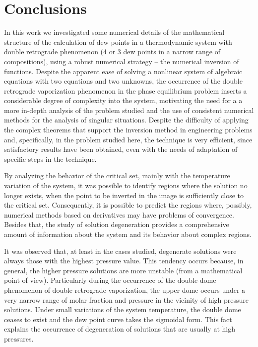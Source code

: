 \documentclass[journal=iecred,manuscript=article]{achemso}
\theoremstyle{definition}
\theoremstyle{remark}
\begin{document}
\section{Conclusions}

In this work we investigated some numerical details of the mathematical structure of the calculation of dew points in a thermodynamic system with double retrograde phenomenon (4 or 3 dew points in a narrow range of compositions), using a robust numerical strategy -- the numerical inversion of functions. Despite the apparent ease of solving a nonlinear system of algebraic equations with two equations and two unknowns, the occurrence of the double retrograde vaporization phenomenon in the phase equilibrium problem inserts a considerable degree of complexity into the system, motivating the need for a a more in-depth analysis of the problem studied and the use of consistent numerical methods for the analysis of singular situations. Despite the difficulty of applying the complex theorems that support the inversion method in engineering problems and, specifically, in the problem studied here, the technique is very efficient, since satisfactory results have been obtained, even with the needs of adaptation of specific steps in the technique.

By analyzing the behavior of the critical set, mainly with the temperature variation of the system, it was possible to identify regions where the solution no longer exists, when the point to be inverted in the image is sufficiently close to the critical set. Consequently, it is possible to predict the regions where, possibly, numerical methods based on derivatives may have problems of convergence. Besides that, the study of solution degeneration provides a comprehensive amount of information about the system and its behavior about complex regions.

It was observed that, at least in the cases studied, degenerate solutions were always those with the highest pressure value. This tendency occurs because, in general, the higher pressure solutions are more unstable (from a mathematical point of view). Particularly during the occurrence of the double-dome phenomenon of double retrograde vaporization, the upper dome occurs under a very narrow range of molar fraction and pressure in the vicinity of high pressure solutions. Under small variations of the system temperature, the double dome ceases to exist and the dew point curve takes the sigmoidal form. This fact explains the occurrence of degeneration of solutions that are usually at high pressures.
\end{document}
